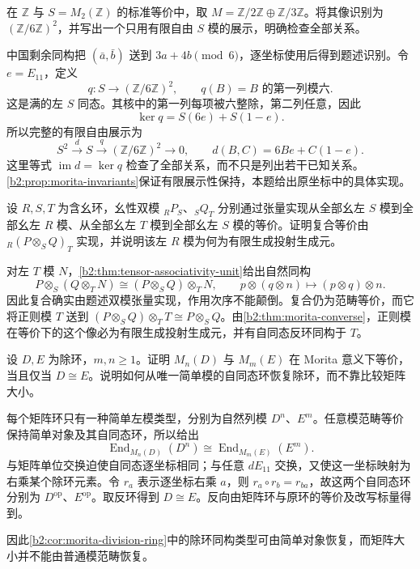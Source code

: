 \begin{exercise}\label{b2:ex:16-finite-presentation}
	在 \(\mathbb Z\) 与 \(S=M_2(\mathbb Z)\) 的标准等价中，取 \(M=\mathbb Z/2\mathbb Z\oplus\mathbb Z/3\mathbb Z\)。将其像识别为 \((\mathbb Z/6\mathbb Z)^2\)，并写出一个只用有限自由 \(S\) 模的展示，明确检查全部关系。
\end{exercise}
\begin{solution}
	中国剩余同构把 \((\bar a,\bar b)\) 送到 \(3a+4b\pmod6\)，逐坐标使用后得到题述识别。令 \(e=E_{11}\)，定义
	\[
		q:S\longrightarrow(\mathbb Z/6\mathbb Z)^2,\qquad q(B)=\text{\(B\) 的第一列模六}.
	\]
	这是满的左 \(S\) 同态。其核中的第一列每项被六整除，第二列任意，因此
	\[
		\ker q=S(6e)+S(1-e).
	\]
	所以完整的有限自由展示为
	\[
		S^2\xrightarrow{\ d\ }S\xrightarrow{\ q\ } (\mathbb Z/6\mathbb Z)^2\longrightarrow0,\qquad d(B,C)=6Be+C(1-e).
	\]
	这里等式 \(\operatorname{im}d=\ker q\) 检查了全部关系，而不只是列出若干已知关系。\cref{b2:prop:morita-invariants}保证有限展示性保持，本题给出原坐标中的具体实现。
\end{solution}

\begin{exercise}\label{b2:ex:16-compose-bimodule-equivalences}
	设 \(R,S,T\) 为含幺环，幺性双模 \({}_RP_S\)、\({}_SQ_T\) 分别通过张量实现从全部幺左 \(S\) 模到全部幺左 \(R\) 模、从全部幺左 \(T\) 模到全部幺左 \(S\) 模的等价。证明复合等价由 \({}_R(P\otimes_SQ)_T\) 实现，并说明该左 \(R\) 模为何为有限生成投射生成元。
\end{exercise}
\begin{solution}
	对左 \(T\) 模 \(N\)，\cref{b2:thm:tensor-associativity-unit}给出自然同构
	\[
		P\otimes_S(Q\otimes_TN)\cong(P\otimes_SQ)\otimes_TN, \qquad p\otimes(q\otimes n)\longmapsto(p\otimes q)\otimes n.
	\]
	因此复合确实由题述双模张量实现，作用次序不能颠倒。复合仍为范畴等价，而它将正则模 \(T\) 送到 \((P\otimes_SQ)\otimes_TT\cong P\otimes_SQ\)。由\cref{b2:thm:morita-converse}，正则模在等价下的这个像必为有限生成投射生成元，并有自同态反环同构于 \(T\)。
\end{solution}

\begin{exercise}\label{b2:ex:16-equivalent-to-division-ring}
	设 \(D,E\) 为除环，\(m,n\ge1\)。证明 \(M_n(D)\) 与 \(M_m(E)\) 在 Morita 意义下等价，当且仅当 \(D\cong E\)。说明如何从唯一简单模的自同态环恢复除环，而不靠比较矩阵大小。
\end{exercise}
\begin{solution}
	每个矩阵环只有一种简单左模类型，分别为自然列模 \(D^n\)、\(E^m\)。任意模范畴等价保持简单对象及其自同态环，所以给出
	\[
		\operatorname{End}_{M_n(D)}(D^n) \cong\operatorname{End}_{M_m(E)}(E^m).
	\]
	与矩阵单位交换迫使自同态逐坐标相同；与任意 \(dE_{11}\) 交换，又使这一坐标映射为右乘某个除环元素。令 \(r_a\) 表示逐坐标右乘 \(a\)，则 \(r_a\circ r_b=r_{ba}\)，故这两个自同态环分别为 \(D^{\mathrm{op}}\)、\(E^{\mathrm{op}}\)。取反环得到 \(D\cong E\)。反向由矩阵环与原环的等价及改写标量得到。

	因此\cref{b2:cor:morita-division-ring}中的除环同构类型可由简单对象恢复，而矩阵大小并不能由普通模范畴恢复。
\end{solution}


